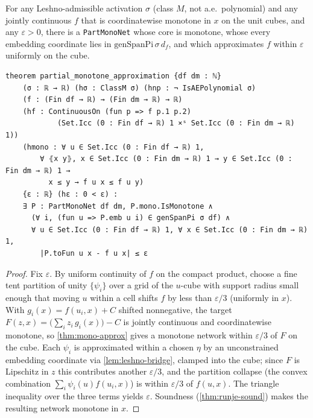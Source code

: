 \begin{theorem}\label{thm:runje-uap}
  \leanok
  For any Leshno-admissible activation $\sigma$ (class $M$, not a.e.\ polynomial) and any jointly
  continuous $f$ that is coordinatewise monotone in $x$ on the unit cubes, and any
  $\varepsilon>0$, there is a \texttt{PartMonoNet} whose core is monotone, whose every embedding
  coordinate lies in $\mathrm{genSpanPi}\,\sigma\,d_f$, and which approximates $f$ within
  $\varepsilon$ uniformly on the cube.
\end{theorem}
\begin{verbatim}
theorem partial_monotone_approximation {df dm : ℕ}
    (σ : ℝ → ℝ) (hσ : ClassM σ) (hnp : ¬ IsAEPolynomial σ)
    (f : (Fin df → ℝ) → (Fin dm → ℝ) → ℝ)
    (hf : ContinuousOn (fun p => f p.1 p.2)
            (Set.Icc (0 : Fin df → ℝ) 1 ×ˢ Set.Icc (0 : Fin dm → ℝ) 1))
    (hmono : ∀ u ∈ Set.Icc (0 : Fin df → ℝ) 1,
        ∀ ⦃x y⦄, x ∈ Set.Icc (0 : Fin dm → ℝ) 1 → y ∈ Set.Icc (0 : Fin dm → ℝ) 1 →
          x ≤ y → f u x ≤ f u y)
    {ε : ℝ} (hε : 0 < ε) :
    ∃ P : PartMonoNet df dm, P.mono.IsMonotone ∧
      (∀ i, (fun u => P.emb u i) ∈ genSpanPi σ df) ∧
      ∀ u ∈ Set.Icc (0 : Fin df → ℝ) 1, ∀ x ∈ Set.Icc (0 : Fin dm → ℝ) 1,
        |P.toFun u x - f u x| ≤ ε
\end{verbatim}
\begin{proof}\leanok
  Fix $\varepsilon$. By uniform continuity of $f$ on the compact product, choose a fine tent
  partition of unity $\{\psi_i\}$ over a grid of the $u$-cube with support radius small enough that
  moving $u$ within a cell shifts $f$ by less than $\varepsilon/3$ (uniformly in $x$). With
  $g_i(x)=f(u_i,x)+C$ shifted nonnegative, the target $F(z,x)=\big(\sum_i z_i\,g_i(x)\big)-C$ is
  jointly continuous and coordinatewise monotone, so \cref{thm:mono-approx} gives a monotone
  network within $\varepsilon/3$ of $F$ on the cube. Each $\psi_i$ is approximated within a chosen
  $\eta$ by an unconstrained embedding coordinate via \cref{lem:leshno-bridge}, clamped into the
  cube; since $F$ is Lipschitz in $z$ this contributes another $\varepsilon/3$, and the partition
  collapse (the convex combination $\sum_i\psi_i(u)f(u_i,x)$) is within $\varepsilon/3$ of
  $f(u,x)$. The triangle inequality over the three terms yields $\varepsilon$. Soundness
  (\cref{thm:runje-sound}) makes the resulting network monotone in $x$.
\end{proof}


